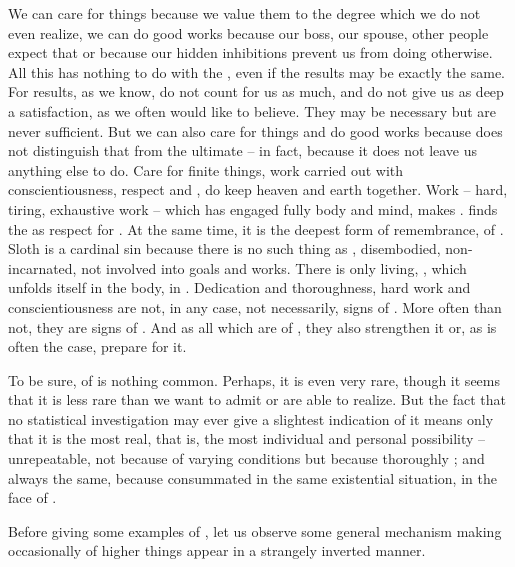 We can care for things because we value them to the degree which we do not even
realize, we can do good works because our boss, our spouse, other people expect
that or because our hidden inhibitions prevent us from doing otherwise. All this
has nothing to do with the , even if the 
results may be exactly the same. For  results, as we know, do not
count for us as much, and do not give us as deep a satisfaction, as we often
would like to believe. They may be necessary but are never sufficient.  But we
can also care for things and do good works because  does not
distinguish that from the ultimate  -- in fact, because it does not
leave us anything else to do.  Care for finite things, work carried out with
conscientiousness, respect and , do keep heaven and earth together.
Work -- hard, tiring, exhaustive work -- which has engaged fully body and mind,
makes .  finds the  as respect
for . At the same time, it is the deepest form of
remembrance,  of .  Sloth is a cardinal sin because
there is no such thing as , disembodied, non-incarnated, not
involved into  goals and works. There is only living, , which unfolds itself in the body, in .  Dedication and
thoroughness, hard work and conscientiousness are not, in any case, not
necessarily, signs of . More often than not, they are signs of
. And as all  which are  of ,
they also strengthen it or, as is often the case, prepare for it.

To be sure,  of  is nothing common. Perhaps, it
is even very rare, though it seems that it is less rare than we want to admit or
are able to realize.  But the fact that no statistical investigation may ever
give a slightest indication of it means only that it is the most real, that is,
the most individual and personal possibility -- unrepeatable, not because of
varying  conditions but because thoroughly ; and always
the same, because consummated in the same existential situation, in the face of
.


\label{pa:inversion}
Before giving some examples of , let us observe some
general mechanism making occasionally  of higher things
appear in a strangely inverted manner.

